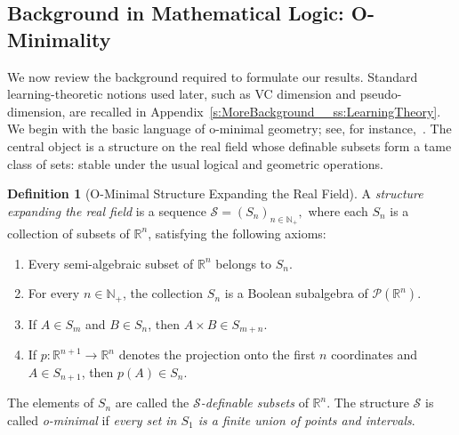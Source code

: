 \documentclass{article}
\theoremstyle{plain}
\theoremstyle{definition}
\newtheorem{definition}[theorem]{Definition}
\theoremstyle{remark}
\newcommand{\reals}{\mathbb{R}}
\theoremstyle{plain}
\numberwithin{thm}{section}
\theoremstyle{definition}
\numberwithin{equation}{section}
\begin{document}
\subsection{Background in Mathematical Logic: O-Minimality}
\label{s:ModGeo__ss:oMinimality}


We now review the background required to formulate our results.  Standard learning-theoretic notions used later, such as VC dimension and pseudo-dimension, are recalled in Appendix~\ref{s:MoreBackground__ss:LearningTheory}.
We begin with the basic language of o-minimal geometry; see, for instance,~\citep{vandenDries1998tame,coste1999introduction}.  The central object is a structure on the real field whose definable subsets form a tame class of sets: stable under the usual logical and geometric operations.

\begin{definition}[O-Minimal Structure Expanding the Real Field]
\label{def:o-minimal-structure}
A \emph{structure expanding the real field} is a sequence
$
    \mathcal{S}=(S_n)_{n\in\mathbb{N}_+},
$
where each $S_n$ is a collection of subsets of $\reals^n$, satisfying the following axioms:
\begin{enumerate}
    \item[(i)] Every semi-algebraic subset of $\reals^n$ belongs to $S_n$.
    
    \item[(ii)] For every $n\in\mathbb{N}_+$, the collection $S_n$ is a Boolean subalgebra of $\mathcal{P}(\reals^n)$.
    
    \item[(iii)] If $A\in S_m$ and $B\in S_n$, then $A\times B\in S_{m+n}$.
    
    \item[(iv)] If $p:\reals^{n+1}\to\reals^n$ denotes the projection onto the first $n$ coordinates and $A\in S_{n+1}$, then $p(A)\in S_n$.
\end{enumerate}
The elements of $S_n$ are called the \emph{$\mathcal{S}$-definable subsets} of $\reals^n$. The structure $\mathcal{S}$ is called \emph{o-minimal} if \emph{every set in $S_1$ is a finite union of points and intervals}.
\end{definition}
\end{document}
